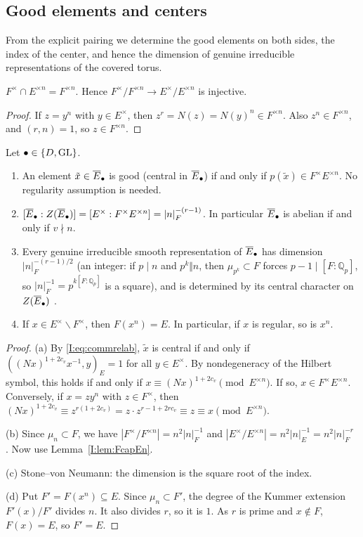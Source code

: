 \subsection{Good elements and centers}\label{I:subsec:good}
From the explicit pairing we determine the good elements on both sides, the index of the center, and hence the dimension of genuine irreducible representations of the covered torus.

\begin{lemma}\label{I:lem:FcapEn}
$F^\times\cap E^{\times n}=F^{\times n}$. Hence $F^\times/F^{\times n}\to E^\times/E^{\times n}$ is injective.
\end{lemma}
\begin{proof}
If $z=y^n$ with $y\in E^\times$, then $z^r=N(z)=N(y)^n\in F^{\times n}$. Also $z^n\in F^{\times n}$, and $(r,n)=1$, so $z\in F^{\times n}$.
\end{proof}

\begin{proposition}\label{I:prop:good}
Let $\bullet\in\{D,\mathrm{GL}\}$.
\begin{enumerate}[label=(\alph*)]
\item An element $\tilde x\in\overline{E}_\bullet$ is good (central in $\overline{E}_\bullet$) if and only if $p(\tilde x)\in F^\times E^{\times n}$. No regularity assumption is needed.
\item $[\overline{E}_\bullet:Z(\overline{E}_\bullet)]=[E^\times:F^\times E^{\times n}]=|n|_F^{-(r-1)}$. In particular $\overline{E}_\bullet$ is abelian if and only if $v\nmid n$.
\item Every genuine irreducible smooth representation of $\overline{E}_\bullet$ has dimension $|n|_F^{-(r-1)/2}$ (an integer: if $p\mid n$ and $p^k\Vert n$, then $\mu_{p^k}\subset F$ forces $p-1\mid[F:\mathbb Q_p]$, so $|n|_F^{-1}=p^{k[F:\mathbb Q_p]}$ is a square), and is determined by its central character on $Z(\overline{E}_\bullet)$ \cite[Prop.~2.4]{JC26a}.
\item If $x\in E^\times\smallsetminus F^\times$, then $F(x^n)=E$. In particular, if $x$ is regular, so is $x^n$.
\end{enumerate}
\end{proposition}

\begin{proof}
(a) By \eqref{I:eq:commrelab}, $\tilde x$ is central if and only if $((Nx)^{1+2c_v}x^{-1},y)_E=1$ for all $y\in E^\times$. By nondegeneracy of the Hilbert symbol, this holds if and only if $x\equiv(Nx)^{1+2c_v}\pmod{E^{\times n}}$. If so, $x\in F^\times E^{\times n}$. Conversely, if $x=zy^n$ with $z\in F^\times$, then $(Nx)^{1+2c_v}\equiv z^{r(1+2c_v)}=z\cdot z^{r-1+2rc_v}\equiv z\equiv x\pmod{E^{\times n}}$.

(b) Since $\mu_n\subset F$, we have $|F^\times/F^{\times n}|=n^2|n|_F^{-1}$ and $|E^\times/E^{\times n}|=n^2|n|_E^{-1}=n^2|n|_F^{-r}$ \cite[Ch.~II, \S5]{Neu99} \Ev. Now use Lemma~\ref{I:lem:FcapEn}.

(c) Stone--von Neumann: the dimension is the square root of the index.

(d) Put $F'=F(x^n)\subseteq E$. Since $\mu_n\subset F'$, the degree of the Kummer extension $F'(x)/F'$ divides $n$. It also divides $r$, so it is $1$. As $r$ is prime and $x\notin F$, $F(x)=E$, so $F'=E$.
\end{proof}

